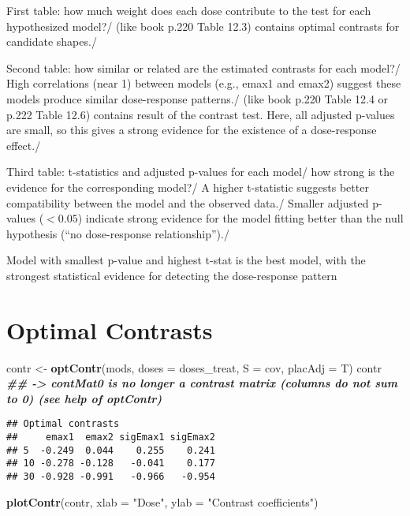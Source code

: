 \documentclass[
]{article}
\newenvironment{Shaded}{\begin{snugshade}}{\end{snugshade}}
\newcommand{\AttributeTok}[1]{\textcolor[rgb]{0.13,0.29,0.53}{#1}}
\newcommand{\DocumentationTok}[1]{\textcolor[rgb]{0.56,0.35,0.01}{\textbf{\textit{#1}}}}
\newcommand{\FunctionTok}[1]{\textcolor[rgb]{0.13,0.29,0.53}{\textbf{#1}}}
\newcommand{\NormalTok}[1]{#1}
\newcommand{\OtherTok}[1]{\textcolor[rgb]{0.56,0.35,0.01}{#1}}
\newcommand{\StringTok}[1]{\textcolor[rgb]{0.31,0.60,0.02}{#1}}
\begin{document}
First table: how much weight does each dose contribute to the test for
each hypothesized model?/ (like book p.220 Table 12.3) contains optimal
contrasts for candidate shapes./

Second table: how similar or related are the estimated contrasts for
each model?/ High correlations (near 1) between models (e.g., emax1 and
emax2) suggest these models produce similar dose-response patterns./
(like book p.220 Table 12.4 or p.222 Table 12.6) contains result of the
contrast test. Here, all adjusted p-values are small, so this gives a
strong evidence for the existence of a dose-response effect./

Third table: t-statistics and adjusted p-values for each model/ how
strong is the evidence for the corresponding model?/ A higher
t-statistic suggests better compatibility between the model and the
observed data./ Smaller adjusted p-values (\(< 0.05\)) indicate strong
evidence for the model fitting better than the null hypothesis (``no
dose-response relationship'')./

Model with smallest p-value and highest t-stat is the best model, with
the strongest statistical evidence for detecting the dose-response
pattern

\hypertarget{optimal-contrasts}{%
\section{Optimal Contrasts}\label{optimal-contrasts}}

\begin{Shaded}
\begin{Highlighting}[]
\NormalTok{contr }\OtherTok{\textless{}{-}} \FunctionTok{optContr}\NormalTok{(mods, }\AttributeTok{doses =}\NormalTok{ doses\_treat, }\AttributeTok{S =}\NormalTok{ cov, }\AttributeTok{placAdj =}\NormalTok{ T)}
\NormalTok{contr }\DocumentationTok{\#\# {-}\textgreater{} contMat0 is no longer a contrast matrix (columns do not sum to 0) (see help of optContr)}
\end{Highlighting}
\end{Shaded}

\begin{verbatim}
## Optimal contrasts
##     emax1  emax2 sigEmax1 sigEmax2
## 5  -0.249  0.044    0.255    0.241
## 10 -0.278 -0.128   -0.041    0.177
## 30 -0.928 -0.991   -0.966   -0.954
\end{verbatim}

\begin{Shaded}
\begin{Highlighting}[]
\FunctionTok{plotContr}\NormalTok{(contr, }\AttributeTok{xlab =} \StringTok{"Dose"}\NormalTok{, }\AttributeTok{ylab =} \StringTok{"Contrast coefficients"}\NormalTok{)}
\end{Highlighting}
\end{Shaded}
\end{document}
